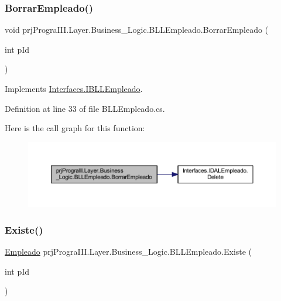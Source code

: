 \subsubsection{\texorpdfstring{Borrar\+Empleado()}{BorrarEmpleado()}}
{\footnotesize\ttfamily void prj\+Progra\+I\+I\+I.\+Layer.\+Business\+\_\+\+Logic.\+B\+L\+L\+Empleado.\+Borrar\+Empleado (\begin{DoxyParamCaption}\item[{int}]{p\+Id }\end{DoxyParamCaption})}



Implements \hyperlink{interface_interfaces_1_1_i_b_l_l_empleado_a284b5811be96490bc0567612f428e8a5}{Interfaces.\+I\+B\+L\+L\+Empleado}.



Definition at line 33 of file B\+L\+L\+Empleado.\+cs.

Here is the call graph for this function\+:
\nopagebreak
\begin{figure}[H]
\begin{center}
\leavevmode
\includegraphics[width=350pt]{classprj_progra_i_i_i_1_1_layer_1_1_business___logic_1_1_b_l_l_empleado_a1a8bb078f6d78bb7a1153f25b9006c73_cgraph}
\end{center}
\end{figure}
\hypertarget{classprj_progra_i_i_i_1_1_layer_1_1_business___logic_1_1_b_l_l_empleado_a48d3674dd0f14fd4e3a95f6fdcea4467}{}\label{classprj_progra_i_i_i_1_1_layer_1_1_business___logic_1_1_b_l_l_empleado_a48d3674dd0f14fd4e3a95f6fdcea4467} 
\subsubsection{\texorpdfstring{Existe()}{Existe()}}
{\footnotesize\ttfamily \hyperlink{classprj_progra_i_i_i_1_1_layer_1_1_entities_1_1_empleado}{Empleado} prj\+Progra\+I\+I\+I.\+Layer.\+Business\+\_\+\+Logic.\+B\+L\+L\+Empleado.\+Existe (\begin{DoxyParamCaption}\item[{int}]{p\+Id }\end{DoxyParamCaption})}



